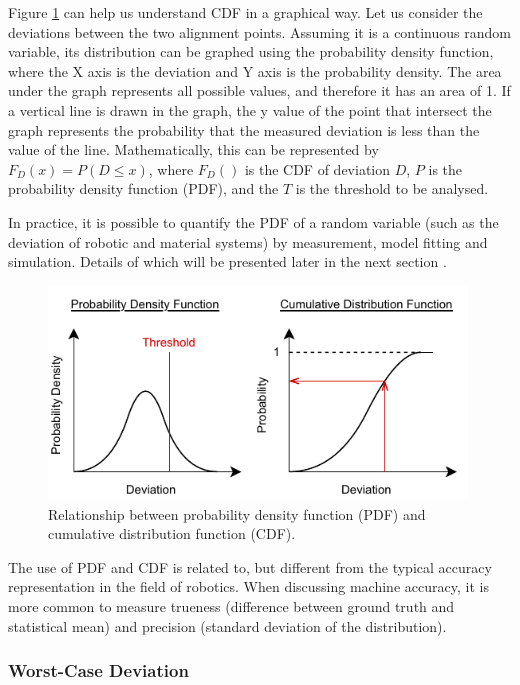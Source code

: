 Figure \ref{fig:pdf-and-cdf} can help us understand CDF in a graphical way. Let us consider the deviations between the two alignment points. Assuming it is a continuous random variable, its distribution can be graphed using the probability density function, where the X axis is the deviation and Y axis is the probability density. The area under the graph represents all possible values, and therefore it has an area of 1. If a vertical line is drawn in the graph, the y value of the point that intersect the graph represents the probability that the measured deviation is less than the value of the line. Mathematically, this can be represented by $F_D (x) = P (D \leq x)$, where $F_D ()$ is the CDF of deviation $D$, $P$ is the probability density function (PDF), and the $T$ is the threshold to be analysed.

In practice, it is possible to quantify the PDF of a random variable (such as the deviation of robotic and material systems) by measurement, model fitting and simulation. Details of which will be presented later in the next section .

\begin{figure}[ht]
    \centering
    \includegraphics[width=0.99\textwidth]{images/09/Density Function.pdf}
    \caption{Relationship between probability density function (PDF) and cumulative distribution function (CDF).}
    \label{fig:pdf-and-cdf}
\end{figure}


The use of PDF and CDF is related to, but different from the typical accuracy representation in the field of robotics. When discussing machine accuracy, it is more common to measure trueness (difference between ground truth and statistical mean) and precision (standard deviation of the distribution). 

\subsubsection{Worst-Case Deviation}
\label{subsubsection:worst-case-deviation}

